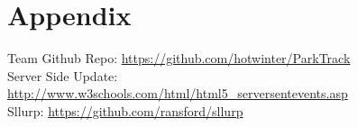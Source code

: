 \documentclass[12pt, a4paper]{article}
\begin{document}
\section{Appendix}
Team Github Repo: \url{https://github.com/hotwinter/ParkTrack}\\
Server Side Update: \url{http://www.w3schools.com/html/html5_serversentevents.asp}\\
Sllurp: \url{https://github.com/ransford/sllurp}
\end{document}
